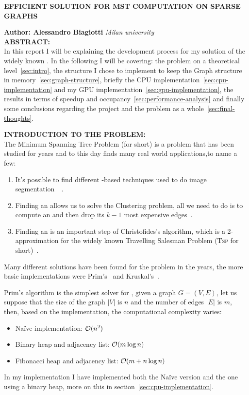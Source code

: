 \documentclass[a4paper,10pt]{article}
\begin{document}
\noindent
\begin{center}
	\textbf{{EFFICIENT SOLUTION FOR MST COMPUTATION ON SPARSE GRAPHS}} \\
\end{center}

\noindent
\textbf{Author: Alessandro Biagiotti} \hfill \textit{Milan university}
\\

\noindent
\textbf{ABSTRACT:}
\\
In this report I will be explaining the development process for my solution of the widely known \mstp. In the following I will be covering: the problem on a theoretical level~\ref{sec:intro}, the structure I chose to implement to keep the Graph structure in memory~\ref{sec:graph-structure}, briefly the CPU implementation~\ref{sec:cpu-implementation} and my GPU implementation~\ref{sec:gpu-implementation}, the results in terms of speedup and occupancy~\ref{sec:performance-analysis} and finally some conclusions regarding the project and the problem as a whole~\ref{sec:final-thoughts}.

\bigskip

\makeatletter{}\makeatother\label{sec:intro}
\noindent
\textbf{INTRODUCTION TO THE PROBLEM:}
\\
The Minimum Spanning Tree Problem (\mstp for short) is a problem that has been studied for years and to this day finds many real world applications,to name a few:
\begin{enumerate}
	\item It's possible to find different \mst-based techniques used to do image segmentation~\cite{maze-generation}~\cite{mst-segmentation-heuristic}.
	\item Finding an \mst allows us to solve the Clustering problem, all we need to do is to compute an \mst and then drop its $k - 1$ most expensive edges~\cite{mst-applications}.
	\item Finding an \mst is an important step of Christofides's algorithm, which is a 2-approximation for the widely known Travelling Salesman Problem (\textsc{Tsp} for short)~\cite{tsp-christofides}.
\end{enumerate}

Many different solutions have been found for the problem in the years, the more basic implementations were Prim's~\cite{prim-algorithm} and Kruskal's~\cite{kruskal-algorithm}.

Prim's algorithm is the simplest solver for \mstp, given a graph $G= (V, E)$, let us suppose that the size of the graph $|V|$ is $n$ and the number of edges $|E|$ is $m$, then, based on the implementation, the computational complexity varies:
\begin{itemize}
	\item Na\"ive implementation: $\mathcal{O}(n^2)$
	\item Binary heap and adjacency list: $\mathcal{O}(m\log{n})$
	\item Fibonacci heap and adjacency list: $\mathcal{O}(m + n\log{n})$
\end{itemize}
In my implementation I have implemented both the Na\"ive version and the one using a binary heap, more on this in section~\ref{sec:cpu-implementation}.
\end{document}

